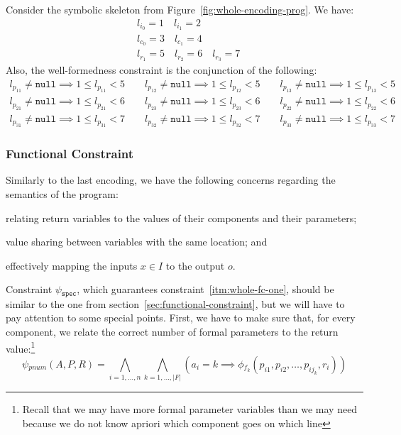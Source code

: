 \begin{example}
  Consider the symbolic skeleton from Figure~\ref{fig:whole-encoding-prog}.
  We have:
  \begin{align*}
    &l_{i_0} = 1 \quad l_{i_1} = 2 \\
    &l_{c_0} = 3 \quad l_{c_1} = 4 \\
    &l_{r_1} = 5 \quad l_{r_2} = 6 \quad l_{r_3} = 7
  \end{align*}
  Also, the well-formedness constraint is the conjunction of the following:
  \begin{align*}
           l_{p_{11}} \neq \mathtt{null} \implies 1 \leq l_{p_{11}} < 5
    \qquad l_{p_{12}} \neq \mathtt{null} \implies 1 \leq l_{p_{12}} < 5
    \qquad l_{p_{13}} \neq \mathtt{null} \implies 1 \leq l_{p_{13}} < 5 \\
           l_{p_{21}} \neq \mathtt{null} \implies 1 \leq l_{p_{21}} < 6
    \qquad l_{p_{23}} \neq \mathtt{null} \implies 1 \leq l_{p_{23}} < 6
    \qquad l_{p_{22}} \neq \mathtt{null} \implies 1 \leq l_{p_{22}} < 6 \\
           l_{p_{31}} \neq \mathtt{null} \implies 1 \leq l_{p_{31}} < 7
    \qquad l_{p_{32}} \neq \mathtt{null} \implies 1 \leq l_{p_{32}} < 7
    \qquad l_{p_{33}} \neq \mathtt{null} \implies 1 \leq l_{p_{33}} < 7
  \end{align*}
\end{example}
%
\subsubsection{Functional Constraint}

Similarly to the last encoding, we have the following concerns regarding the
semantics of the program:
\begin{enumerate*}[(1)]
\item \label{itm:whole-fc-one} relating return variables to the values of their
components and their parameters;
\item \label{itm:whole-fc-two} value sharing between variables with the same
location; and
\item \label{itm:whole-fc-three} effectively mapping the inputs $x \in I$ to the
output $o$.
\end{enumerate*}

Constraint $\psi{}_{\mathtt{spec}}$, which guarantees
constraint~\ref{itm:whole-fc-one}, should be similar to the one from
section~\ref{sec:functional-constraint}, but we will have to pay attention to
some special points.
First, we have to make sure that, for every component, we relate the correct
number of formal parameters to the return value:\footnote{Recall that we may
have more formal parameter variables than we may need because we do not know
apriori which component goes on which line}
%
\[
  \psi{}_{pnum}(A, P, R) =
  \bigwedge_{i=1,\ldots,n}\bigwedge_{k=1,\ldots,|F|}
  (a_i = k \implies \phi{}_{f_{k}}(p_{i1}, p_{i2}, \ldots, p_{ij_k}, r_i))
\]

